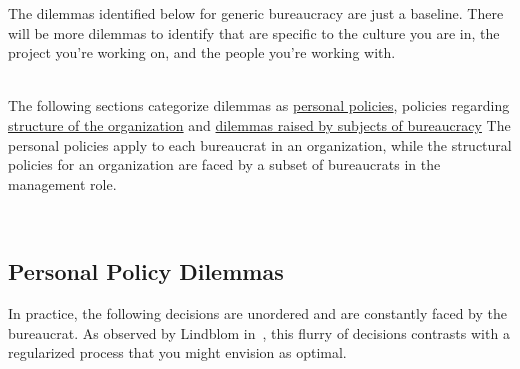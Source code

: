 The dilemmas identified below for generic bureaucracy are just a baseline. There will be more dilemmas to identify that are specific to the culture you are in, the project you're working on, and the people you're working with. 

\ \\

The following sections categorize dilemmas as \hyperref[sec:personal-policy-dilemmas]{personal policies}, 
policies regarding \hyperref[sec:org-dilemma]{structure of the organization}\iftoggle{haspagenumbers}{ (page~\pageref{sec:org-dilemma}),}{,}
and \hyperref[sec:subjects-dilemmas]{dilemmas raised by subjects of bureaucracy}\iftoggle{haspagenumbers}{ (page~\pageref{sec:subjects-dilemmas}).}{.}
The personal policies apply to each bureaucrat in an organization, while the structural policies for an organization are faced by a subset of bureaucrats in the management role. 



\ \\


\subsection*{Personal Policy Dilemmas \label{sec:personal-policy-dilemmas}}


In practice, the following decisions are unordered and are constantly faced by the bureaucrat. As observed by Lindblom in~\cite{1959_Lindblom}, this flurry of decisions contrasts with a regularized process that you might envision as optimal.


